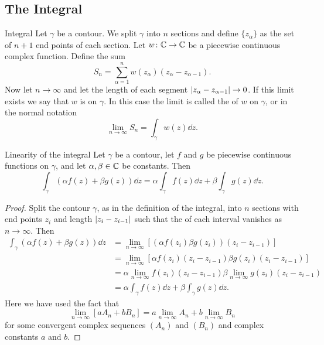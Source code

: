 \documentclass{article}
\begin{document}
    \subsection{The Integral}
    \begin{definition}{Integral}{}
        Let \(\gamma\) be a contour.
        We split \(\gamma\) into \(n\) sections and define \(\{z_{\alpha}\}\) as the set of \(n + 1\) end points of each section.
        Let \(w\colon\mathbb{C}\to\mathbb{C}\) be a piecewise continuous complex function.
        Define the sum
        \[S_n = \sum_{\alpha = 1}^{n} w(z_\alpha)(z_{\alpha} - z_{\alpha - 1}).\]
        Now let \(n\to\infty\) and let the length of each segment \(\abs{z_\alpha - z_{\alpha - 1}} \to 0\).
        If this limit exists we say that \(w\) is  on \(\gamma\).
        In this case the limit is called the  of \(w\) on \(\gamma\), or in the normal notation
        \[ \lim_{n\to\infty} S_n = \int_\gamma w(z) \dd{z}.\]
    \end{definition}
    \begin{lemma}{Linearity of the integral}{}
        Let \(\gamma\) be a contour, let \(f\) and \(g\) be piecewise continuous functions on \(\gamma\), and let \(\alpha, \beta\in\mathbb{C}\) be constants.
        Then
        \[\int_\gamma (\alpha f(z) + \beta g(z)) \dd{z} = \alpha \int_\gamma f(z) \dd{z} + \beta \int_\gamma g(z) \dd{z}.\]
    \end{lemma}
    \begin{proof}
        Split the contour \(\gamma\), as in the definition of the integral, into \(n\) sections with end points \(z_{i}\) and length \(\abs{z_{i} - z_{i - 1}}\) such that the of each interval vanishes as \(n \to \infty\).
        Then
        \begin{align*}
            \int_\gamma (\alpha f(z) + \beta g(z)) \dd{z} &= \lim_{n\to\infty} \left[(\alpha f(z_{i}) \beta g(z_i))(z_i - z_{i-1})\right]\\
            &= \lim_{n\to\infty} \left[\alpha f(z_{i})(z_i - z_{i-1}) \beta g(z_i)(z_i - z_{i-1})\right]\\
            &= \alpha\lim_{n\to\infty} f(z_{i})(z_i - z_{i-1}) \beta\lim_{n\to\infty} g(z_i)(z_i - z_{i-1})\\
            &= \alpha \int_\gamma f(z) \dd{z} + \beta \int_\gamma g(z) \dd{z}.
        \end{align*}
        Here we have used the fact that
        \[\lim_{n\to\infty} [aA_n + bB_n] = a\lim_{n\to\infty}A_n + b\lim_{n\to\infty}B_n\]
        for some convergent complex sequences \((A_n)\) and \((B_n)\) and complex constants \(a\) and \(b\).
    \end{proof}
\end{document}
